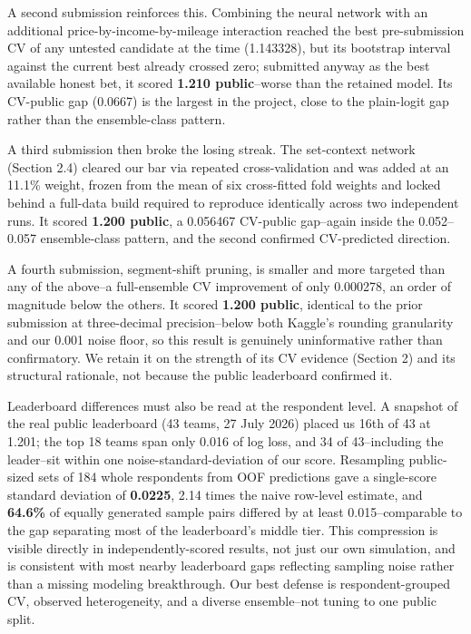 \documentclass[
  9.5pt,
]{article}
\begin{document}
A second submission reinforces this. Combining the neural network with
an additional price-by-income-by-mileage interaction reached the best
pre-submission CV of any untested candidate at the time (1.143328), but
its bootstrap interval against the current best already crossed zero;
submitted anyway as the best available honest bet, it scored
\textbf{1.210 public}--worse than the retained model. Its CV-public gap
(0.0667) is the largest in the project, close to the plain-logit gap
rather than the ensemble-class pattern.

A third submission then broke the losing streak. The set-context network
(Section 2.4) cleared our bar via repeated cross-validation and was
added at an 11.1\% weight, frozen from the mean of six cross-fitted fold
weights and locked behind a full-data build required to reproduce
identically across two independent runs. It scored \textbf{1.200
public}, a 0.056467 CV-public gap--again inside the 0.052--0.057
ensemble-class pattern, and the second confirmed CV-predicted direction.

A fourth submission, segment-shift pruning, is smaller and more targeted
than any of the above--a full-ensemble CV improvement of only 0.000278,
an order of magnitude below the others. It scored \textbf{1.200 public},
identical to the prior submission at three-decimal precision--below both
Kaggle's rounding granularity and our 0.001 noise floor, so this result
is genuinely uninformative rather than confirmatory. We retain it on the
strength of its CV evidence (Section 2) and its structural rationale,
not because the public leaderboard confirmed it.

Leaderboard differences must also be read at the respondent level. A
snapshot of the real public leaderboard (43 teams, 27 July 2026) placed
us 16th of 43 at 1.201; the top 18 teams span only 0.016 of log loss,
and 34 of 43--including the leader--sit within one
noise-standard-deviation of our score. Resampling public-sized sets of
184 whole respondents from OOF predictions gave a single-score standard
deviation of \textbf{0.0225}, 2.14 times the naive row-level estimate,
and \textbf{64.6\%} of equally generated sample pairs differed by at
least 0.015--comparable to the gap separating most of the leaderboard's
middle tier. This compression is visible directly in
independently-scored results, not just our own simulation, and is
consistent with most nearby leaderboard gaps reflecting sampling noise
rather than a missing modeling breakthrough. Our best defense is
respondent-grouped CV, observed heterogeneity, and a diverse
ensemble--not tuning to one public split.
\end{document}
